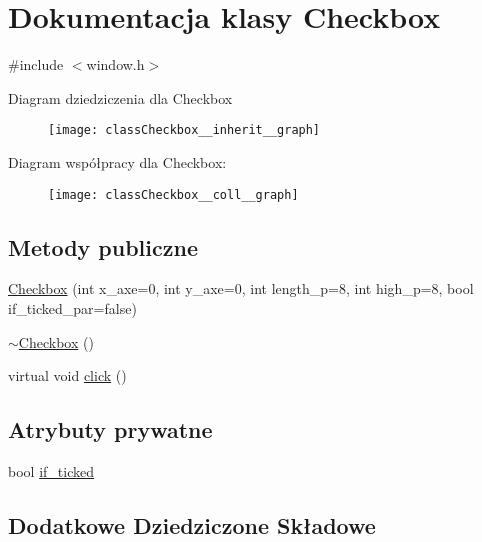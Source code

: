 \hypertarget{classCheckbox}{}\section{Dokumentacja klasy Checkbox}
\label{classCheckbox}


{\ttfamily \#include $<$window.\+h$>$}



Diagram dziedziczenia dla Checkbox
\nopagebreak
\begin{figure}[H]
\begin{center}
\leavevmode
\texttt{[image: classCheckbox\_\_inherit\_\_graph]}
\end{center}
\end{figure}


Diagram współpracy dla Checkbox\+:
\nopagebreak
\begin{figure}[H]
\begin{center}
\leavevmode
\texttt{[image: classCheckbox\_\_coll\_\_graph]}
\end{center}
\end{figure}
\subsection*{Metody publiczne}
\begin{DoxyCompactItemize}
\item 
\hyperlink{classCheckbox_a0cf04b4e75ccdde26151a4c8ee30064d}{Checkbox} (int x\+\_\+axe=0, int y\+\_\+axe=0, int length\+\_\+p=8, int high\+\_\+p=8, bool if\+\_\+ticked\+\_\+par=false)
\item 
\hyperlink{classCheckbox_a828c1436e32c8be0d9d395286d8e6bfe}{$\sim$\+Checkbox} ()
\item 
virtual void \hyperlink{classCheckbox_afd75946a43da1dcba8e6f04f00df34ee}{click} ()
\end{DoxyCompactItemize}
\subsection*{Atrybuty prywatne}
\begin{DoxyCompactItemize}
\item 
bool \hyperlink{classCheckbox_a3a35b7a1272d8aa2d349d0e8820220b5}{if\+\_\+ticked}
\end{DoxyCompactItemize}
\subsection*{Dodatkowe Dziedziczone Składowe}


